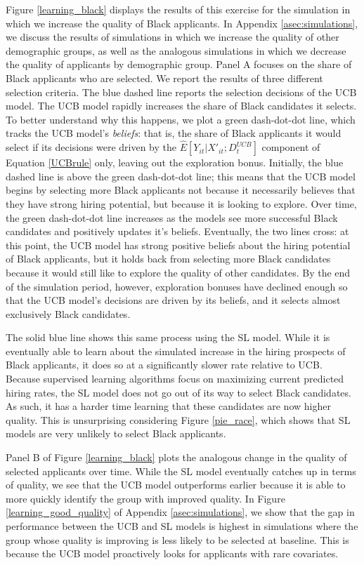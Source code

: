 \documentclass[crop,noquery,editorname,historyrev,nosurname,runningno,sepcount]{RESTUD}
\begin{document}
Figure \ref{learning_black} displays the results of this exercise for the simulation in which we increase the quality of Black applicants.  In Appendix \ref{asec:simulations}, we discuss the results of simulations in which we increase the quality of other demographic groups, as well as the analogous simulations in which we decrease the quality of applicants by demographic group. Panel A focuses on the share of Black applicants who are selected.  We report the results of three different selection criteria.  The blue dashed line reports the selection decisions of the UCB model.  The UCB model rapidly increases the share of Black candidates it selects.  To better understand why this happens, we plot a green dash-dot-dot line, which tracks the UCB model's \textit{beliefs}: that is, the share of Black applicants it would select if its decisions were driven by the $\hat{E}[Y_{it}|X'_{it}; D^{UCB}_{t}]$ component of Equation \eqref{UCBrule} only, leaving out the exploration bonus.  Initially, the blue dashed line is above the green dash-dot-dot line; this means that the UCB model begins by selecting more Black applicants not because it necessarily believes that they have strong hiring potential, but because it is looking to explore.  Over time, the green dash-dot-dot line increases as the models see more successful Black candidates and positively updates it's beliefs.  Eventually, the two lines cross: at this point, the UCB model has strong positive beliefs about the hiring potential of Black applicants, but it holds back from selecting more Black candidates because it would still like to explore the quality of other candidates.  By the end of the simulation period, however, exploration bonuses have declined enough so that the UCB model's decisions are driven by its beliefs, and it selects almost exclusively Black candidates.   

The solid blue line shows this same process using the SL model.  While it is eventually able to learn about the simulated increase in the hiring prospects of Black applicants, it does so at a significantly slower rate relative to UCB.  Because supervised learning algorithms focus on maximizing current predicted hiring rates, the SL model does not go out of its way to select Black candidates.  As such, it has a harder time learning that these candidates are now higher quality.  This is unsurprising considering Figure \ref{pie_race}, which shows that SL models are very unlikely to select Black applicants.  

Panel B of Figure \ref{learning_black} plots the analogous change in the quality of selected applicants over time.  While the SL model eventually catches up in terms of quality, we see that the UCB model outperforms earlier because it is able to more quickly identify the group with improved quality.  In Figure \ref{learning_good_quality} of Appendix \ref{asec:simulations}, we show that the gap in performance between the UCB and SL models is highest in simulations where the group whose quality is improving is less likely to be selected at baseline.  This is because the UCB model proactively looks for applicants with rare covariates. 
\end{document}
